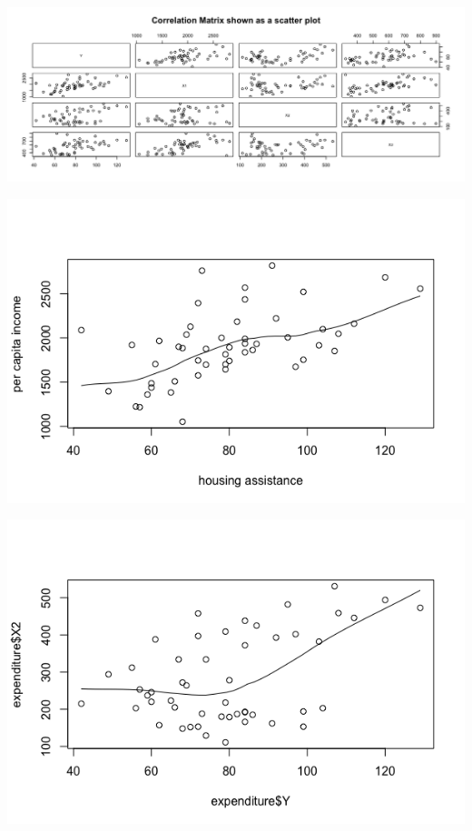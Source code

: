 \documentclass[12pt,letterpaper]{article}
\begin{document}
\includegraphics[width=\linewidth]{Rplot-marklkm.png}
 
\includegraphics[width=\linewidth]{Scatter Smooth Rplot.png}
  
 \includegraphics[width=\linewidth]{X1 and X2 Rplot.png}
 
\end{document}
